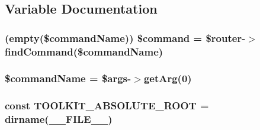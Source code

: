\subsection{Variable Documentation}
\hypertarget{toolkit_8php_a53ec4b824571cbb319ce1e7ecc6abec1}{
\subsubsection[{\$command}]{ (empty(\$command\-Name)) \$command = \$router-\/$>$find\-Command(\$command\-Name)}}\label{toolkit_8php_a53ec4b824571cbb319ce1e7ecc6abec1}
\hypertarget{toolkit_8php_a60e2f1f45f969130e21d7f44fe93eb0d}{
\subsubsection[{\$command\-Name}]{\setlength{\rightskip}{0pt plus 5cm}\$command\-Name = \$args-\/$>$get\-Arg(0)}}\label{toolkit_8php_a60e2f1f45f969130e21d7f44fe93eb0d}
\hypertarget{toolkit_8php_a293f551f12530f8d375b3a7018382ae0}{
\subsubsection[{T\-O\-O\-L\-K\-I\-T\-\_\-\-A\-B\-S\-O\-L\-U\-T\-E\-\_\-\-R\-O\-O\-T}]{\setlength{\rightskip}{0pt plus 5cm}const T\-O\-O\-L\-K\-I\-T\-\_\-\-A\-B\-S\-O\-L\-U\-T\-E\-\_\-\-R\-O\-O\-T = dirname(\-\_\-\-\_\-\-F\-I\-L\-E\-\_\-\-\_\-)}}\label{toolkit_8php_a293f551f12530f8d375b3a7018382ae0}
